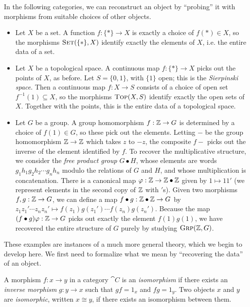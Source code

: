 \begin{ex}\label{ex:recovering structure} In the following categories, we can
  reconstruct an object by ``probing'' it with morphisms from suitable choices
  of other objects.
  \begin{itemize}
    \item Let $X$ be a set. A function $f: \{*\}\to X$ is exactly a choice of
      $f(*)\in X$, so the morphisms ${\textsc{\text{Set}}}(\{*\}, X)$ identify exactly the
      elements of $X$, i.e. the entire data of a set.
    \item Let $X$ be a topological space. A continuous map $f: \{*\}\to X$ picks
      out the points of $X$, as before. Let $S = \{0, 1\}$, with $\{1\}$ open;
      this is the \emph{Sierpinski space}. Then a continuous map $f: X\to S$
      consists of a choice of open set $f^{-1}(1)\subseteq X$, so the morphisms
      ${\textsc{\text{Top}}}(X, S)$ identify exactly the open sets of $X$. Together with
      the points, this is the entire data of a topological space.
    \item Let $G$ be a group. A group homomorphism $f: \mathbb{Z}\to G$ is determined by a
      choice of $f(1)\in G$, so these pick out the elements. Letting $-$ be
      the group homomorphism $\mathbb{Z}\to\mathbb{Z}$ which takes $z$ to $-z$, the composite
      $f-$ picks out the inverse of the element identified by $f$. To recover
      the multiplicative structure, we consider the \emph{free product group}
      $G\bullet H$, whose elements are words $g_1h_1g_2h_2\cdots g_nh_n$ modulo
      the relations of $G$ and $H$, and whose multiplication is concatenation.
      There is a canonical map $\varphi: \mathbb{Z}\to\mathbb{Z}\bullet\mathbb{Z}$ given by $1\mapsto
      11'$ (we represent elements in the second copy of $\mathbb{Z}$ with $'$s).
      Given two morphisms $f,g: \mathbb{Z}\to G$, we can define a map $f\bullet g:
      \mathbb{Z}\bullet\mathbb{Z}\to G$ by $z_1z_1'\cdots z_nz_n' \mapsto f(z_1)g(z_1')\cdots
      f(z_n)g(z_n')$. Because the map $(f\bullet g)\varphi: \mathbb{Z}\to G$ picks out
      exactly the element $f(1)g(1)$, we have recovered the entire structure of $G$
      purely by studying ${\textsc{\text{Grp}}}(\mathbb{Z}, G)$.
  \end{itemize}
\end{ex}

These examples are instances of a much more general theory, which we begin to
develop here. We first need to formalize what we mean by ``recovering the
data'' of an object.

\begin{dfn}[isomorphism]\label{def:isomorphism}
  A morphism $f: x\to y$ in a category $\cat{C}$ is an \emph{isomorphism} if
  there exists an \emph{inverse morphism} $g: y\to x$ such that $gf = 1_x$ and
  $fg = 1_y$. Two objects $x$ and $y$ are \emph{isomorphic}, written $x\cong y$,
  if there exists an isomorphism between them.
\end{dfn}

